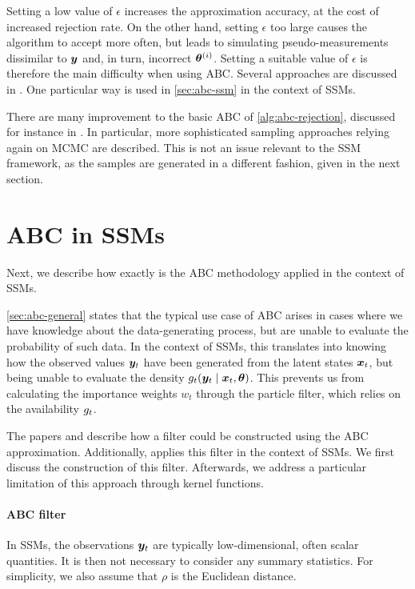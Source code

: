 Setting a low value of $\epsilon$ increases the approximation accuracy, at the cost of increased rejection rate. On the other hand, setting $\epsilon$ too large causes the algorithm to accept more often, but leads to simulating pseudo-measurements dissimilar to $\bm{y}$ and, in turn, incorrect $\bm{\theta}^{(i)}$. Setting a suitable value of $\epsilon$ is therefore the main difficulty when using ABC. Several approaches are discussed in \cite{jasra-filtering, jasra-time-series}. One particular way \citep{dedecius} is used in \autoref{sec:abc-ssm} in the context of SSMs.

There are many improvement to the basic ABC of \autoref{alg:abc-rejection}, discussed for instance in \cite{abc-recent}. In particular, more sophisticated sampling approaches relying again on MCMC are described. This is not an issue relevant to the SSM framework, as the samples are generated in a different fashion, given in the next section.

\section{ABC in SSMs} \label{sec:abc-ssm}
Next, we describe how exactly is the ABC methodology applied in the context of SSMs.

\autoref{sec:abc-general} states that the typical use case of ABC arises in cases where we have knowledge about the data-generating process, but are unable to evaluate the probability of such data. In the context of SSMs, this translates into knowing how the observed values $\bm{y}_t$ have been generated from the latent states $\bm{x}_t$, but being unable to evaluate the density $g_t(\bm{y}_t \mid \bm{x}_t, \bm{\theta})$. This prevents us from calculating the importance weights $w_t$ through the particle filter, which relies on the availability $g_t$.

The papers \cite{tina-toni} and \cite{jasra-filtering} describe how a filter could be constructed using the ABC approximation. Additionally, \cite{jasra-time-series} applies this filter in the context of SSMs. We first discuss the construction of this filter. Afterwards, we address a particular limitation of this approach through kernel functions.

\paragraph{ABC filter}
In SSMs, the observations $\bm{y}_t$ are typically low-dimensional, often scalar quantities. It is then not necessary to consider any summary statistics. For simplicity, we also assume that $\rho$ is the Euclidean distance.

